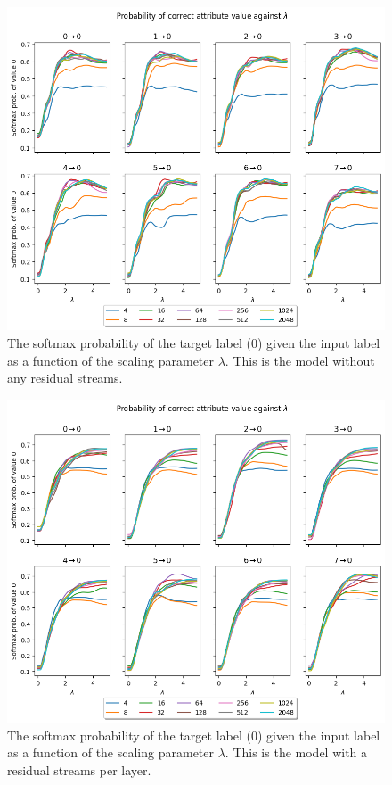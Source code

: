 \begin{figure}
    \centering
    \includegraphics[height=0.4\textheight]{figures/no-residual-steering.png}
    \caption{The softmax probability of the target label (0) given the input label as a function of the scaling parameter $\lambda$. This is the model without any residual streams.}
    \label{fig:nr-steering}
\end{figure}

\begin{figure}
    \centering
    \includegraphics[height=0.4\textheight]{figures/residual-steering.png}
    \caption{The softmax probability of the target label (0) given the input label as a function of the scaling parameter $\lambda$. This is the model with a residual streams per layer.}
    \label{fig:r-steering}
\end{figure}

